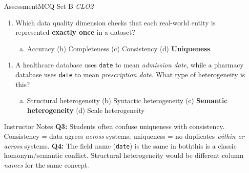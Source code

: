 \documentclass[aspectratio=169,10pt]{beamer}
\begin{document}
\begin{frame}{Assessment\textemdash MCQ Set B \hfill\small\textit{CLO2}}
  \vspace{6pt}
  \begin{enumerate}[\textbf{Q3.}]
    \item Which data quality dimension checks that each real-world entity is represented \textbf{exactly once} in a dataset?
    \begin{enumerate}[(a)]
      \item Accuracy \quad
      (b) Completeness \quad
      (c) Consistency \quad
      (d) \textbf{Uniqueness}
    \end{enumerate}
  \end{enumerate}
  \vspace{8pt}
  \begin{enumerate}[\textbf{Q4.}]
    \item A healthcare database uses \texttt{date} to mean \emph{admission date}, while a pharmacy database uses \texttt{date} to mean \emph{prescription date}.  What type of heterogeneity is this?
    \begin{enumerate}[(a)]
      \item Structural heterogeneity \quad
      (b) Syntactic heterogeneity \quad
      (c) \textbf{Semantic heterogeneity} \quad
      (d) Scale heterogeneity
    \end{enumerate}
  \end{enumerate}
  \vspace{8pt}
  \begin{alertblock}{Instructor Notes}
    \textbf{Q3:} Students often confuse uniqueness with consistency.  Consistency = data agrees \emph{across} systems; uniqueness = no duplicates \emph{within or across} systems.  \textbf{Q4:} The field name (\texttt{date}) is the same in both\textemdash this is a classic homonym/semantic conflict.  Structural heterogeneity would be different column \emph{names} for the same concept.
  \end{alertblock}
\end{frame}
\end{document}
